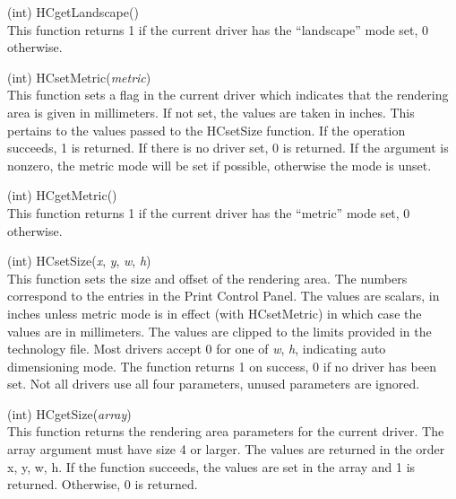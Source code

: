 \begin{description}
\item{(int) \vt HCgetLandscape()}\\
This function returns 1 if the current driver has the ``landscape''
mode set, 0 otherwise.

\item{(int) \vt HCsetMetric({\it metric\/})}\\
This function sets a flag in the current driver which indicates that
the rendering area is given in millimeters.  If not set, the values
are taken in inches.  This pertains to the values passed to the {\vt
HCsetSize} function.  If the operation succeeds, 1 is returned.  If
there is no driver set, 0 is returned.  If the argument is nonzero,
the metric mode will be set if possible, otherwise the mode is unset.

\item{(int) \vt HCgetMetric()}\\
This function returns 1 if the current driver has the ``metric'' mode
set, 0 otherwise.

\item{(int) \vt HCsetSize({\it x}, {\it y}, {\it w}, {\it h\/})}\\
This function sets the size and offset of the rendering area.  The
numbers correspond to the entries in the {\cb Print Control Panel}. 
The values are scalars, in inches unless metric mode is in effect
(with {\vt HCsetMetric}) in which case the values are in millimeters. 
The values are clipped to the limits provided in the technology file. 
Most drivers accept 0 for one of {\it w}, {\it h}, indicating auto
dimensioning mode.  The function returns 1 on success, 0 if no driver
has been set.  Not all drivers use all four parameters, unused
parameters are ignored.

\item{(int) \vt HCgetSize({\it array\/})}\\
This function returns the rendering area parameters for the current
driver.  The array argument must have size 4 or larger.  The values
are returned in the order x, y, w, h.  If the function succeeds, the
values are set in the array and 1 is returned.  Otherwise, 0 is
returned.


\end{description}
